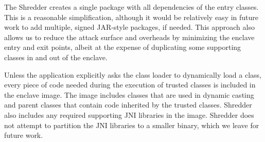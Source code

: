 The Shredder creates a single package with all dependencies of the
entry classes.
This is a reasonable simplification, although 
it would be relatively easy in future work to add multiple, signed JAR-style packages,
if needed.
This approach also allows us to 
reduce the attack surface and overheads by minimizing the 
enclave entry and exit points, albeit at the expense of duplicating some supporting
classes in and out of the enclave.




Unless the application explicitly asks the class loader to
dynamically load a class,
every piece of code needed during the execution of trusted classes
is included in the enclave image.
The image includes classes that are used in dynamic casting and parent classes 
that contain code inherited by the trusted classes.
Shredder also includes any required supporting JNI libraries in the image.
Shredder does not attempt to partition the JNI libraries to a smaller binary,
which we leave for future work.



